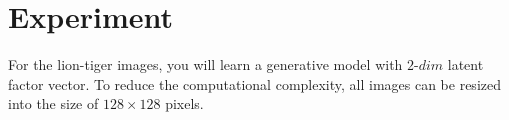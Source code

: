 \documentclass[11pt]{article}
\begin{document}
\section{Experiment}
For the lion-tiger images, you will learn a generative model with $2$-$dim$ latent factor vector. To reduce the computational complexity, all images can be resized into the size of $128 \times 128$ pixels. 
\begin{figure}[h]
	\centering
	\setlength{\fboxrule}{1pt}
	\setlength{\fboxsep}{0cm}	
	\\
\end{figure}
\end{document}
